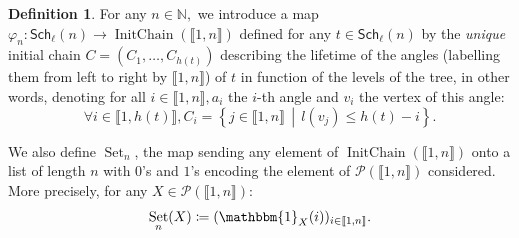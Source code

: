 \documentclass[a4paper,10pt]{amsart}
\DeclareMathOperator{\IC}{InitChain}
\DeclareMathOperator{\Set}{Set}
\newcommand\Schl{\mathsf{Sch}_\ell}
\newcommand\NN{\mathbb{N}}
\newcommand{\IEM}[2]{\llbracket #1,#2 \rrbracket}
\theoremstyle{definition}
\newtheorem{defi}{Definition}
\begin{document}
\begin{defi}\label{defi:lifetime}
	For any $n\in\NN,$ we introduce a map $\varphi_n: \Schl(n)\rightarrow \IC(\IEM{1}{n})$ defined for any $t\in\Schl(n)$ by the \emph{unique} initial chain $C=\left(C_1,\dots,C_{h(t)}\right)$ describing the lifetime of the angles (labelling them from left to right by $\IEM{1}{n}$) of $t$ in function of the levels of the tree, in other words, denoting for all $i\in\IEM{1}{n},a_i$ the $i$-th angle and $v_i$ the vertex of this angle:
	\[
	\forall i \in\IEM{1}{h(t)}, C_i=\left\{ j \in\IEM{1}{n} \,\middle|\, l(v_j)\leq h(t)-i\right\}.
	\]
	
	We also define $\Set_n$, the map sending any element of $\IC(\IEM{1}{n})$ onto a list of length $n$ with $0$'s and $1$'s encoding the element of $\mathcal{P}(\IEM{1}{n})$ considered. More precisely, for any ${X\in\mathcal{P}(\IEM{1}{n})}$:
	\[
	\Set_n(X)\coloneq (\mathbbm{1}_X(i))_{i\in\IEM{1}{n}}.
	\]
\end{defi}
\end{document}
